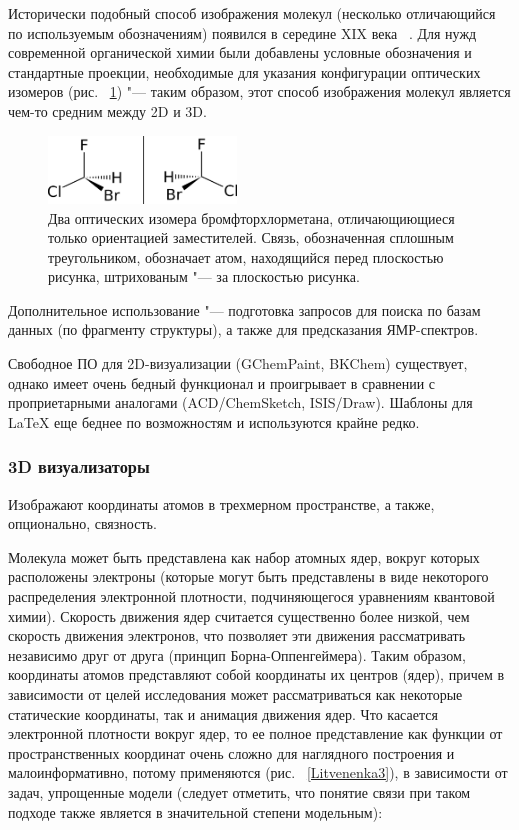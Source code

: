 \documentclass[10pt, a5paper]{article}
\begin{document}
Исторически подобный способ изображения молекул (несколько отличающийся по используемым обозначениям) появился в середине XIX века ~\cite{Litvenenka2}. Для нужд современной органической химии были добавлены условные обозначения и стандартные проекции, необходимые для указания конфигурации оптических изомеров (рис. ~\ref{Litvenenka2}) "--- таким образом, этот способ изображения молекул является чем-то средним между 2D и 3D.

\begin{figure}[h!]
  \centering
  \includegraphics[width=5cm]{20_2016_Litvenenka2.png}
  \caption{Два оптических изомера бромфторхлорметана, отличающиющиеся только ориентацией заместителей. Связь, обозначенная сплошным треугольником, обозначает атом, находящийся перед плоскостью рисунка, штрихованым "--- за плоскостью рисунка.}
  \label{Litvenenka2}
\end{figure}

Дополнительное использование "--- подготовка запросов для поиска по базам данных (по фрагменту структуры), а также для предсказания ЯМР-спектров.

Свободное ПО для 2D-визуализации (GChemPaint, BKChem) существует, однако имеет очень бедный функционал и проигрывает в сравнении с проприетарными аналогами (ACD/ChemSketch, ISIS/Draw). Шаблоны для LaTeX еще беднее по возможностям и используются крайне редко.

\subsubsection*{3D визуализаторы}

Изображают координаты атомов в трехмерном пространстве, а также, опционально, связность.

Молекула может быть представлена как набор атомных ядер, вокруг которых расположены электроны (которые могут быть представлены в виде некоторого распределения электронной плотности, подчиняющегося уравнениям квантовой химии). Скорость движения ядер считается существенно более низкой, чем скорость движения электронов, что позволяет эти движения рассматривать независимо друг от друга (принцип Борна-Оппенгеймера). Таким образом, координаты атомов представляют собой координаты их центров (ядер), причем в зависимости от целей исследования может рассматриваться как некоторые статические координаты, так и анимация движения ядер. Что касается электронной плотности вокруг ядер, то ее полное представление как функции от пространственных координат очень сложно для наглядного построения и малоинформативно, потому применяются (рис. ~\ref{Litvenenka3}), в зависимости от задач, упрощенные модели (следует отметить, что понятие связи при таком подходе также является в значительной степени модельным):
\end{document}
